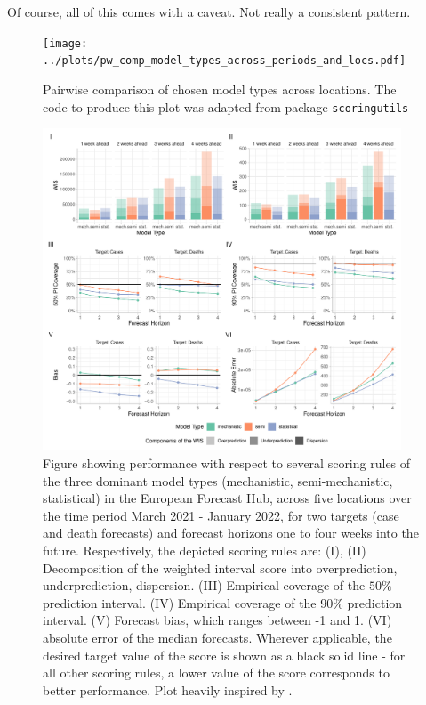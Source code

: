 Of course, all of this comes with a caveat. Not really a consistent pattern.
\begin{figure}
\centering
\texttt{[image: ../plots/pw\_comp\_model\_types\_across\_periods\_and\_locs.pdf]}
\caption{Pairwise comparison of chosen model types across locations. The code to produce this plot was adapted from package \texttt{scoringutils}}
\label{fig:pw_comp_modeltypes_byloc}
\end{figure}
\begin{figure}
\centering
\includegraphics[width = 0.95\textwidth]{../plots/overall_assessment_model_types.pdf}
\caption{Figure showing performance with respect to several scoring rules of the three dominant model types (mechanistic, semi-mechanistic, statistical) in the European Forecast Hub, across five locations over the time period March 2021 - January 2022, for two targets (case and death forecasts) and forecast horizons one to four weeks into the future. Respectively, the depicted scoring rules are: (I), (II) Decomposition of the weighted interval score into overprediction, underprediction, dispersion. (III) Empirical coverage of the $50\%$ prediction interval. (IV) Empirical coverage of the $90\%$ prediction interval. (V) Forecast bias, which ranges between -1 and 1. (VI) absolute error of the median forecasts. Wherever applicable, the desired target value of the score is shown as a black solid line - for all other scoring rules, a lower value of the score corresponds to better performance. Plot heavily inspired by \cite{bosse_comparing_2021-1}. }
\label{fig:decomp_model_types}
\end{figure}
